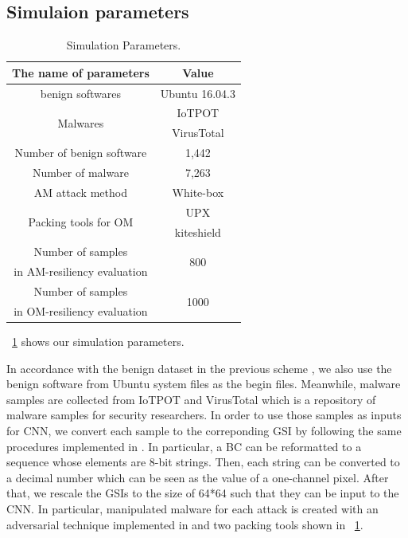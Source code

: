 \documentclass{ieeeaccess}
\begin{document}
\subsection{Simulaion parameters}
\begin{table}[h]
	\begin{center}
		\caption{Simulation Parameters.}
		\label{tab:simulation_parameters} 
		\begin{tabular}{|c|c|} \hline
			The name of parameters & Value\\ \hline \hline
			benign softwares & Ubuntu 16.04.3\cite{ubuntu}\\ \hline
			\multirow{2}{*}{\hfill Malwares  \hfill} & IoTPOT\cite{iotpot} \\ 
																							 & VirusTotal\cite{virustotal}\\ \hline
			Number of benign software  & 1,442 \\  \hline
			Number of malware  &  7,263 \\ \hline
			AM attack method & White-box \cite{am, yamafumi} \\ \hline
			\multirow{2}{*}{\hfill Packing tools for OM  \hfill} & UPX\cite{upx} \\ & kiteshield\cite{kiteshield} \\ \hline
			Number of samples  & \multirow{2}{*}{\hfill 800 \hfill} \\  
			in AM-resiliency evaluation & \\ \hline 
			Number of samples  & \multirow{2}{*}{\hfill 1000 \hfill} \\  
			in OM-resiliency evaluation & \\ \hline 
		\end{tabular}
	\end{center}
\end{table} 

\tablename~\ref{tab:simulation_parameters} shows our simulation parameters.

In accordance with the benign dataset in the previous scheme \cite{previous}, we also use the benign software from Ubuntu system files \cite{ubuntu} as the begin files.
Meanwhile, malware samples are collected from IoTPOT \cite{iotpot} and VirusTotal \cite{virustotal} which is a repository of malware samples for security researchers.
In order to use those samples as inputs for CNN, we convert each sample to the correponding GSI by following the same procedures implemented in \cite{previous}.
In particular, a BC can be reformatted to a sequence whose elements are 8-bit strings.
Then, each string can be converted to a decimal number which can be seen as the value of a one-channel pixel.
After that, we rescale the GSIs to the size of 64*64 such that they can be input to the CNN.
In particular, manipulated malware for each attack is created with an adversarial technique implemented in \cite{am, yamafumi} and two packing tools \cite{upx, kiteshield} shown in \tablename~\ref{tab:simulation_parameters}.
\end{document}

